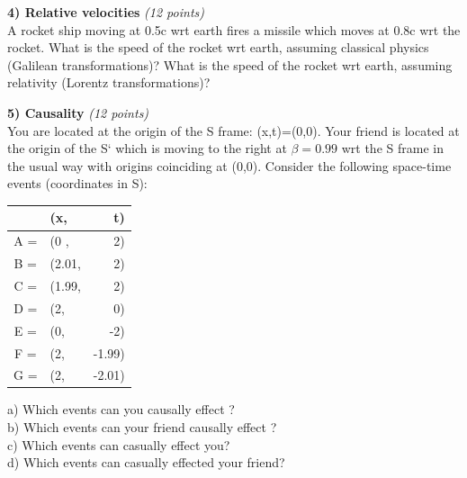{\clearpage

\textbf{4) Relative velocities }\hfill \textit{(12 points)}\\

A rocket ship moving at 0.5c wrt earth fires a missile which moves at 0.8c wrt the rocket.
What is the speed of the rocket wrt earth, assuming classical physics (Galilean transformations)?
What is the speed of the rocket wrt earth, assuming relativity (Lorentz transformations)?

\vspace{2.8in}

\textbf{5) Causality}  \hfill \textit{(12 points)}\\
You are located at the origin of the S frame: (x,t)=(0,0).
Your friend is located at the origin of the S` which is moving to the right at $\beta = 0.99$ wrt the S frame in the usual way with origins coinciding at (0,0).
Consider the following space-time events (coordinates in S):\\
\begin{tabular}{clr}
  & (x,& t)\\
  \hline
  A = & (0   , & 2)\\
  B = & (2.01, & 2)\\
  C = & (1.99, & 2)\\
  D = & (2,    & 0)\\
  E = & (0,    & -2)\\
  F = & (2,    & -1.99)\\
  G = & (2,    & -2.01)\\
\end{tabular}

\vspace{0.1in}

a) Which events can you causally effect ?\\

b) Which events can your friend causally effect ?\\

c) Which events can casually effect you?\\

d) Which events can casually effected your friend?

%
\clearpage

}

